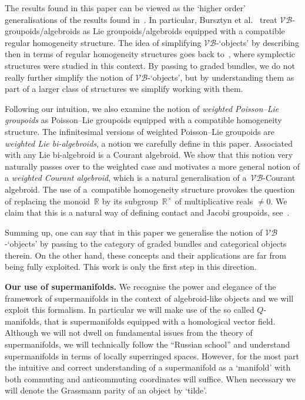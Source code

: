 \documentclass[10pt,a4paper]{amsart}
\numberwithin{equation}{section}
\begin{document}
The results found in this paper can  be viewed as the `higher order' generalisations of the results found in~\cite{Bursztyn:2014}. In particular, Bursztyn et al.~\cite{Bursztyn:2014} treat $\mathcal{VB}$-groupoids/algebroids as Lie groupoids/algebroids equipped with a compatible regular homogeneity structure.  The idea of simplifying $\mathcal{VB}$-`objects' by describing then in terms of regular homogeneity structures goes back to~\cite{Grabowski:2006}, where symplectic structures were studied  in this context.  By passing to graded bundles, we do not really  further simplify the notion of $\mathcal{VB}$-`objects', but by understanding them as part of a larger class of structures we simplify working with them.

Following our intuition, we also examine the notion of \emph{weighted Poisson--Lie groupoids} as  Poisson--Lie groupoids equipped with a compatible homogeneity structure. The inf\/initesimal versions of weighted Poisson--Lie groupoids are \emph{weighted Lie bi-algebroids}, a notion we carefully def\/ine in this paper. Associated with any Lie bi-algebroid is a Courant algebroid. We show that this notion very naturally passes over to the weighted case and motivates a more general notion of a \emph{weighted Courant algebroid}, which is a natural generalisation of a~$\mathcal{VB}$-Courant algebroid.  The use of a~compatible homogeneity structure provokes the question of replacing the monoid~${\mathbb R}$ by its subgroup~${\mathbb R}^\times$ of multiplicative reals $\ne 0$. We claim that this is a natural way of def\/ining contact and Jacobi groupoids, see~\cite{Bruce:2015}.

Summing up, one can say that in this paper we generalise the notion of $\mathcal{VB}$-`objects'  by passing to the category of graded bundles and categorical objects therein.  On the other hand, these concepts and their applications are far from being fully exploited. This work is only the f\/irst step in this direction.

\textbf{Our use of supermanifolds.} We recognise the power and elegance of the framework of supermanifolds in the context of algebroid-like objects and we will exploit this formalism. In particular we will make use of the so called $Q$-manifolds, that is supermanifolds equipped with a homological vector f\/ield. Although we will not dwell on fundamental issues from the theory of supermanifolds, we will technically follow the ``Russian school''  and understand supermanifolds in terms of locally superringed spaces. However, for the most part the intuitive and correct understanding of a supermanifold as a `manifold' with both commuting and anticommuting coordinates will suf\/f\/ice. When necessary we will denote the Grassmann parity of an object by `tilde'.
\end{document}
